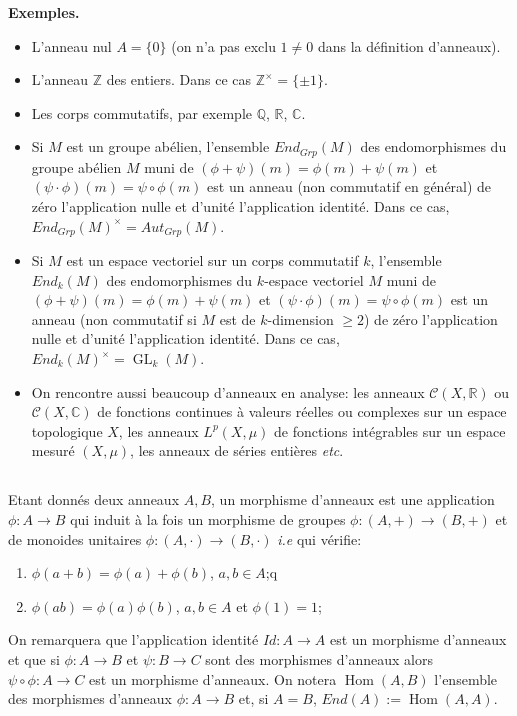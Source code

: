 \documentclass[a4paper, oneside, 12pt]{book}
\theoremstyle{theoremeStyle} %
\theoremstyle{definition} %
\DeclareMathOperator{\SHom}{Hom}
\DeclareMathOperator{\SGL}{GL}
\newcommand{\Q}{\mathbb{Q}}
\newcommand{\C}{\mathbb{C}}
\newcommand{\Z}{\mathbb{Z}}
\newcommand{\R}{\mathbb{R}}
\begin{document}
\textbf{Exemples.}
\begin{itemize}[leftmargin=* ,parsep=0cm,itemsep=0cm,topsep=0cm]
\item L'anneau nul $A=\lbrace 0\rbrace$ (on n'a pas exclu $1\not=0$ dans la définition d'anneaux).
\item L'anneau  $\Z$ des entiers. Dans ce cas  $\Z^\times=\lbrace \pm 1\rbrace$.
\item Les corps commutatifs, par exemple $\Q$, $\R$, $\C$.
\item Si $M$ est un groupe abélien, l'ensemble $End_{Grp}(M)$ des endomorphismes du groupe  abélien $M$ muni de $(\phi+\psi)(m)=\phi(m)+\psi(m)$ et $(\psi\cdot\phi)(m)=\psi\circ \phi(m)$ est  un anneau (non commutatif en général) de zéro l'application nulle et d'unité l'application identité. Dans ce cas,  $End_{Grp}(M)^\times=Aut_{Grp}(M)$.
\item Si $M$ est un espace vectoriel sur un corps commutatif $k$, l'ensemble $End_k(M)$ des endomorphismes du $k$-espace vectoriel  $M$ muni de $(\phi+\psi)(m)=\phi(m)+\psi(m)$ et $(\psi\cdot\phi)(m)=\psi\circ \phi(m)$ est un anneau (non commutatif si $M$ est de $k$-dimension $\geq 2$) de zéro l'application nulle et d'unité l'application identité. Dans ce cas, $End_k(M)^\times=\SGL_k(M)$.
\item On rencontre aussi beaucoup d'anneaux en analyse: les anneaux $\mathcal{C}(X,\R)$ ou $\mathcal{C}(X,\C)$ de fonctions continues à valeurs réelles  ou complexes sur un espace topologique $X$, les anneaux $L^p(X,\mu)$ de fonctions intégrables  sur un espace mesuré $(X,\mu)$, les anneaux de séries entières \textit{etc}.\\
\end{itemize}




\subsection{}Etant donnés deux anneaux $A,B$, un morphisme d'anneaux est une application $\phi:A\rightarrow B$ qui induit à la fois un morphisme de groupes $\phi:(A,+)\rightarrow (B,+)$ et de monoides unitaires $\phi:(A,\cdot)\rightarrow (B,\cdot)$ \textit{i.e} qui vérifie:
\begin{enumerate}
\item $\phi(a+b)=\phi(a)+\phi(b)$, $a,b\in A$;q
\item $\phi(a  b)=\phi(a) \phi(b)$, $a,b\in A$ et $\phi(1)=1$;
\end{enumerate}
On remarquera que l'application identité $Id:A\rightarrow A$ est un morphisme d'anneaux et que si $\phi:A\rightarrow B$ et $\psi:B\rightarrow C$ sont des morphismes d'anneaux alors $\psi\circ \phi:A\rightarrow C$ est un morphisme d'anneaux. On notera $\SHom(A,B)$ l'ensemble des morphismes d'anneaux $\phi:A\rightarrow B$ et, si $A=B$, $End(A):=\SHom(A,A)$. \\
\end{document}
